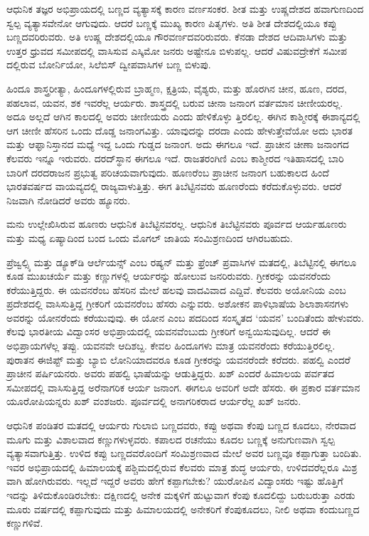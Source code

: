 ಆಧುನಿಕ ತಜ್ಞರ ಅಭಿಪ್ರಾಯದಲ್ಲಿ ಬಣ್ಣದ ವ್ಯತ್ಯಾಸಕ್ಕೆ ಕಾರಣ ವರ್ಣಸಂಕರ. ಶೀತ ಮತ್ತು ಉಷ್ಣದೇಶದ ಹವಾಗುಣದಿಂದ ಸ್ವಲ್ಪ ವ್ಯತ್ಯಾಸವೇನೋ ಆಗುವುದು. ಆದರೆ ಬಣ್ಣಕ್ಕೆ ಮುಖ್ಯ ಕಾರಣ ಪಿತೃಗಳು. ಅತಿ ಶೀತ ದೇಶದಲ್ಲಿಯೂ ಕಪ್ಪು ಬಣ್ಣದವರಿರುವರು. ಅತಿ ಉಷ್ಣ ದೇಶದಲ್ಲಿಯೂ ಗೌರವರ್ಣದವರಿರುವರು. ಕೆನಡಾ ದೇಶದ ಆದಿವಾಸಿಗಳು ಮತ್ತು ಉತ್ತರ ಧ್ರುವದ ಸಮೀಪದಲ್ಲಿ ವಾಸಿಸುವ ಎಸ್ಕಿಮೋ ಜನರು ಅಷ್ಟೇನೂ ಬಿಳುಪಲ್ಲ. ಆದರೆ ವಿಷುವದ್ರೇಕೆಗೆ ಸಮೀಪ ದಲ್ಲಿರುವ ಬೋರ್ನಿಯೋ, ಸಿಲೆಬಿಸ್​ ದ್ವೀಪವಾಸಿಗಳ ಬಣ್ಣ ಬಿಳುಪು.

ಹಿಂದೂ ಶಾಸ್ತ್ರರೀತ್ಯಾ, ಹಿಂದೂಗಳಲ್ಲಿರುವ ಬ್ರಾಹ್ಮಣ, ಕ್ಷತ್ರಿಯ, ವೈಶ್ಯರು, ಮತ್ತು ಹೊರಗಿನ ಚೀನ, ಹೂಣ, ದರದ, ಪಹಲಾವ, ಯವನ, ಶಕ ಇವರೆಲ್ಲ ಆರ್ಯರು. ಶಾಸ್ತ್ರದಲ್ಲಿ ಬರುವ ಚೀನಾ ಜನಾಂಗ ವರ್ತಮಾನ ಚೀಣೀಯರಲ್ಲ. ಅದೂ ಅಲ್ಲದೆ ಆಗಿನ ಕಾಲದಲ್ಲಿ ಅವರು ಚೀಣೀಯರು ಎಂದು ಹೇಳಿಕೊಳ್ಳು ತ್ತಿರಲಿಲ್ಲ. ಈಗಿನ ಕಾಶ್ಮೀರಕ್ಕೆ ಈಶಾನ್ಯದಲ್ಲಿ ಆಗ ಚೀಣೀ ಹೆಸರಿನ ಒಂದು ದೊಡ್ಡ ಜನಾಂಗವಿತ್ತು. ಯಾವುದನ್ನು ದರದಾ ಎಂದು ಹೇಳುತ್ತೇವೆಯೋ ಅದು ಭಾರತ ಮತ್ತು ಆಫ್ಘಾನಿಸ್ತಾನದ ಮಧ್ಯೆ ಇದ್ದ ಒಂದು ಗುಡ್ಡದ ಜನಾಂಗ. ಅದು ಈಗಲೂ ಇದೆ. ಪ್ರಾಚೀನ ಚೀಣಾ ಜನಾಂಗದ ಕೆಲವರು ಇನ್ನೂ ಇರುವರು. ದರದ್​ಸ್ಥಾನ ಈಗಲೂ ಇದೆ. ರಾಜತರಂಗಿಣಿ ಎಂಬ ಕಾಶ್ಮೀರದ ಇತಿಹಾಸದಲ್ಲಿ ಬಾರಿ ಬಾರಿಗೆ ದರದರಾಜನ ಪ್ರಭುತ್ವ ಪರಿಚಯವಾಗುವುದು. ಹೂಣರೆಂಬ ಪ್ರಾಚೀನ ಜನಾಂಗ ಬಹುಕಾಲದ ಹಿಂದೆ ಭಾರತವರ್ಷದ ವಾಯವ್ಯದಲ್ಲಿ ರಾಜ್ಯವಾಳುತ್ತಿತ್ತು. ಈಗ ತಿಬೆಟ್ಟಿನವರು ಹೂಣರೆಂದು ಕರೆದುಕೊಳ್ಳುವರು. ಆದರೆ ನಿಜವಾಗಿ ನೋಡಿದರೆ ಅವರು ಹ್ಯೂನರು.

ಮನು ಉಲ್ಲೇಖಿಸಿರುವ ಹೂಣರು ಆಧುನಿಕ ತಿಬೆಟ್ಟಿನವರಲ್ಲ. ಆಧುನಿಕ ತಿಬೆಟ್ಟಿನವರು ಪೂರ್ವದ ಆರ್ಯಹೂಣರು ಮತ್ತು ಮಧ್ಯ ಏಷ್ಯಾದಿಂದ ಬಂದ ಒಂದು ಮೊಗಲ್​ ಜಾತಿಯ ಸಂಮಿಶ್ರಣದಿಂದ ಆಗಿರಬಹುದು.

ಪ್ರೆಜ್ವಲ್ಸ್ಕಿ ಮತ್ತು ಡ್ಯೂಕ್​ಡಿ ಆರ್ಲೆಯನ್ಸ್​ ಎಂಬ ರಷ್ಯನ್​ ಮತ್ತು ಫ್ರೆಂಚ್​ ಪ್ರವಾಸಿಗಳ ಮತದಲ್ಲಿ, ತಿಬೆಟ್ಟಿನಲ್ಲಿ ಈಗಲೂ ಕೂಡ ಮುಖಚರ್ಯೆ ಮತ್ತು ಕಣ್ಣುಗಳಲ್ಲಿ ಆರ್ಯರನ್ನು ಹೋಲುವ ಜನರಿರುವರು. ಗ್ರೀಕರನ್ನು ಯವನರೆಂದು ಕರೆಯುತ್ತಿದ್ದರು. ಈ ಯವನರೆಂಬ ಹೆಸರಿನ ಮೇಲೆ ಹಲವು ವಾದವಿವಾದ ಎದ್ದಿವೆ. ಕೆಲವರು ಅಯೋನಿಯ ಎಂಬ ಪ್ರದೇಶದಲ್ಲಿ ವಾಸಿಸುತ್ತಿದ್ದ ಗ್ರೀಕರಿಗೆ ಯವನರೆಂಬ ಹೆಸರು ಎನ್ನುವರು. ಅಶೋಕನ ಪಾಳಿಭಾಷೆಯ ಶಿಲಾಶಾಸನಗಳು ಅವರನ್ನು ಯೋನರೆಂದು ಕರೆಯುವುವು. ಈ ಯೋನ ಎಂಬ ಪದದಿಂದ ಸಂಸ್ಕೃತದ ‘ಯವನ’ ಬಂದಿತೆಂದು ಹೇಳುವರು. ಕೆಲವು ಭಾರತೀಯ ವಿದ್ವಾಂಸರ ಅಭಿಪ್ರಾಯದಲ್ಲಿ ಯವನವೆಂಬುದು ಗ್ರೀಕರಿಗೆ ಅನ್ವಯಿಸುವುದಿಲ್ಲ. ಆದರೆ ಈ ಅಭಿಪ್ರಾಯಗಳೆಲ್ಲ ತಪ್ಪು. ಯವನವೇ ಆದಿಶಬ್ದ. ಕೇವಲ ಹಿಂದೂಗಳು ಮಾತ್ರ ಯವನರೆಂದು ಕರೆಯುತ್ತಿರಲಿಲ್ಲ. ಪುರಾತನ ಈಜಿಪ್ಟ್​ ಮತ್ತು ಬ್ಯಾಬಿ ಲೋನಿಯಾದವರೂ ಕೂಡ ಗ್ರೀಕರನ್ನು ಯವನರೆಂದೇ ಕರೆದರು. ಪಹಲ್ವಿ ಎಂದರೆ ಪ್ರಾಚೀನ ಪರ್ಷಿಯನರು. ಅವರು ಪಹಲ್ವಿ ಭಾಷೆಯನ್ನು ಆಡುತ್ತಿದ್ದರು. ಖಶ್​ ಎಂದರೆ ಹಿಮಾಲಯ ಪರ್ವತದ ಸಮೀಪದಲ್ಲಿ ವಾಸಿಸುತ್ತಿದ್ದ ಅರೆನಾಗರಿಕ ಆರ್ಯ ಜನಾಂಗ. ಈಗಲೂ ಅವರಿಗೆ ಅದೇ ಹೆಸರು. ಈ ಪ್ರಕಾರ ವರ್ತಮಾನ ಯೂರೋಪಿಯನ್ನರು ಖಶ್​ ವಂಶಜರು. ಪೂರ್ವದಲ್ಲಿ ಅನಾಗರಿಕರಾದ ಆರ್ಯರೆಲ್ಲ ಖಶ್​ ಜನರು.

ಆಧುನಿಕ ಪಂಡಿತರ ಮತದಲ್ಲಿ ಆರ್ಯರು ಗುಲಾಬಿ ಬಣ್ಣದವರು, ಕಪ್ಪು ಅಥವಾ ಕೆಂಪು ಬಣ್ಣದ ಕೂದಲು, ನೇರವಾದ ಮೂಗು ಮತ್ತು ವಿಶಾಲವಾದ ಕಣ್ಣುಗಳುಳ್ಳವರು. ಕಪಾಲದ ರಚನೆಯು ಕೂದಲ ಬಣ್ಣಕ್ಕೆ ಅನುಗುಣವಾಗಿ ಸ್ವಲ್ಪ ವ್ಯತ್ಯಾಸವಾಗುತ್ತಿತ್ತು. ಉಳಿದ ಕಪ್ಪು ಬಣ್ಣದವರೊಂದಿಗೆ ಸಂಮಿಶ್ರಣವಾದ ಮೇಲೆ ಅವರ ಬಣ್ಣವೂ ಕಪ್ಪಾಗುತ್ತಾ ಬಂದಿತು. ಇವರ ಅಭಿಪ್ರಾಯದಲ್ಲಿ ಹಿಮಾಲಯಕ್ಕೆ ಪಶ್ಚಿಮದಲ್ಲಿರುವ ಕೆಲವರು ಮಾತ್ರ ಶುದ್ಧ ಆರ್ಯರು, ಉಳಿದವರೆಲ್ಲರೂ ಮಿಶ್ರ ವಾಗಿ ಹೋಗಿರುವರು. ಇಲ್ಲದೆ ಇದ್ದರೆ ಅವರು ಹೇಗೆ ಕಪ್ಪಾಗಬೇಕು? ಯುರೋಪಿನ ವಿದ್ವಾಂಸರು ಇಷ್ಟು ಹೊತ್ತಿಗೆ ಇದನ್ನು ತಿಳಿದುಕೊಂಡಿರಬೇಕು: ದಕ್ಷಿಣದಲ್ಲಿ ಅನೇಕ ಮಕ್ಕಳಿಗೆ ಹುಟ್ಟುವಾಗ ಕೆಂಪು ಕೂದಲಿದ್ದು ಬರುಬರುತ್ತಾ ಎರಡು ಮೂರು ವರ್ಷದಲ್ಲಿ ಕಪ್ಪಾಗುವುದು ಮತ್ತು ಹಿಮಾಲಯದಲ್ಲಿ ಅನೇಕರಿಗೆ ಕೆಂಪುಕೂದಲು, ನೀಲಿ ಅಥವಾ ಕಂದುಬಣ್ಣದ ಕಣ್ಣುಗಳಿವೆ.

